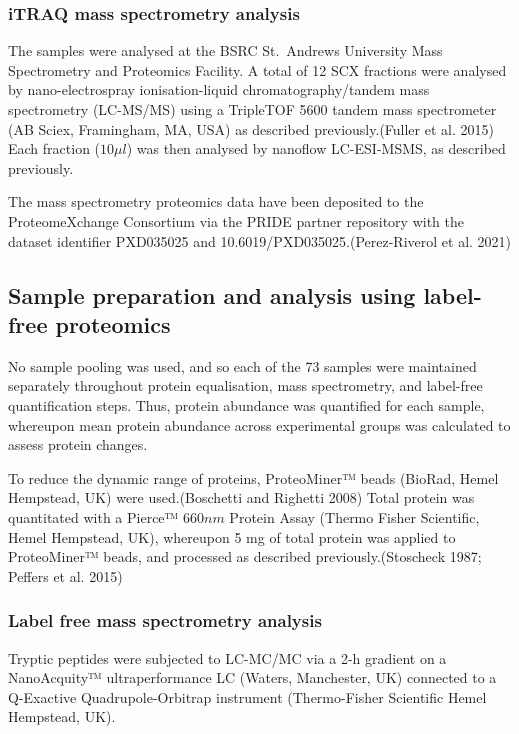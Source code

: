 \documentclass[
]{article}
\begin{document}
\hypertarget{itraq-mass-spectrometry-analysis}{%
\subsubsection{iTRAQ mass spectrometry analysis}\label{itraq-mass-spectrometry-analysis}}

The samples were analysed at the BSRC St.~Andrews University Mass Spectrometry and Proteomics Facility.
A total of 12 SCX fractions were analysed by nano-electrospray ionisation-liquid chromatography/tandem mass spectrometry (LC-MS/MS) using a TripleTOF 5600 tandem mass spectrometer (AB Sciex, Framingham, MA, USA) as described previously.(Fuller et al. 2015)
Each fraction (\(10 \mu l\)) was then analysed by nanoflow LC-ESI-MSMS, as described previously.

The mass spectrometry proteomics data have been deposited to the ProteomeXchange Consortium via the PRIDE partner repository with the dataset identifier PXD035025 and 10.6019/PXD035025.(Perez-Riverol et al. 2021)

\hypertarget{label-free-sample-prep}{%
\subsection{Sample preparation and analysis using label-free proteomics}\label{label-free-sample-prep}}

No sample pooling was used, and so each of the 73 samples were maintained separately throughout protein equalisation, mass spectrometry, and label-free quantification steps.
Thus, protein abundance was quantified for each sample, whereupon mean protein abundance across experimental groups was calculated to assess protein changes.

To reduce the dynamic range of proteins, ProteoMiner™ beads (BioRad, Hemel Hempstead, UK) were used.(Boschetti and Righetti 2008) Total protein was quantitated with a Pierce™ \(660 nm\) Protein Assay (Thermo Fisher Scientific, Hemel Hempstead, UK), whereupon 5 mg of total protein was applied to ProteoMiner™ beads, and processed as described previously.(Stoscheck 1987; Peffers et al. 2015)

\hypertarget{label-free-mass-spectrometry-analysis}{%
\subsubsection{Label free mass spectrometry analysis}\label{label-free-mass-spectrometry-analysis}}

Tryptic peptides were subjected to LC-MC/MC via a 2-h gradient on a NanoAcquity™ ultraperformance LC (Waters, Manchester, UK) connected to a Q-Exactive Quadrupole-Orbitrap instrument (Thermo-Fisher Scientific Hemel Hempstead, UK).
\end{document}
